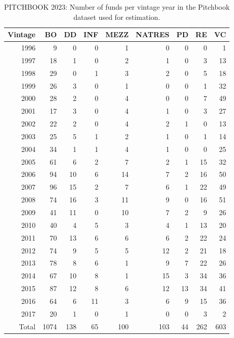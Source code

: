 \documentclass[12pt]{article}
\begin{document}
\begin{table}[ht]
	\centering
	\begin{tabular}{rrrrrrrrr}
		Vintage & BO & DD & INF & MEZZ & NATRES & PD & RE & VC \\ 
		\hline
		\hline
		1996 &   9 &   0 &   0 &   1 &   0 &   0 &   0 &   1 \\ 
		1997 &  18 &   1 &   0 &   2 &   1 &   0 &   3 &  13 \\ 
		1998 &  29 &   0 &   1 &   3 &   2 &   0 &   5 &  18 \\ 
		1999 &  26 &   3 &   0 &   1 &   0 &   0 &   1 &  32 \\ 
		2000 &  28 &   2 &   0 &   4 &   0 &   0 &   7 &  49 \\ 
		2001 &  17 &   3 &   0 &   4 &   1 &   0 &   3 &  27 \\ 
		2002 &  22 &   2 &   0 &   4 &   2 &   1 &   0 &  13 \\ 
		2003 &  25 &   5 &   1 &   2 &   1 &   0 &   1 &  14 \\ 
		2004 &  34 &   1 &   1 &   4 &   1 &   0 &   0 &  25 \\ 
		2005 &  61 &   6 &   2 &   7 &   2 &   1 &  15 &  32 \\ 
		2006 &  94 &  10 &   6 &  14 &   7 &   2 &  16 &  50 \\ 
		2007 &  96 &  15 &   2 &   7 &   6 &   1 &  22 &  49 \\ 
		2008 &  74 &  16 &   3 &  11 &   9 &   0 &  16 &  51 \\ 
		2009 &  41 &  11 &   0 &  10 &   7 &   2 &   9 &  26 \\ 
		2010 &  40 &   4 &   5 &   3 &   4 &   1 &  13 &  20 \\ 
		2011 &  70 &  13 &   6 &   6 &   6 &   2 &  22 &  24 \\ 
		2012 &  74 &   9 &   5 &   5 &  12 &   2 &  21 &  18 \\ 
		2013 &  78 &   8 &   6 &   1 &   9 &   7 &  22 &  26 \\ 
		2014 &  67 &  10 &   8 &   1 &  15 &   3 &  34 &  36 \\ 
		2015 &  87 &  12 &   8 &   6 &  12 &  13 &  34 &  41 \\ 
		2016 &  64 &   6 &  11 &   3 &   6 &   9 &  15 &  36 \\ 
		2017 &  20 &   1 &   0 &   1 &   0 &   0 &   3 &   2 \\ 
		\hline
		Total & 1074 & 138 &  65 & 100 & 103 &  44 & 262 & 603 \\ 
		\hline
		\hline
	\end{tabular}
	\caption{PITCHBOOK 2023: Number of funds per vintage year in the Pitchbook dataset used for estimation.} 
	\label{tab:pitchbook_data}
\end{table}
\end{document}

